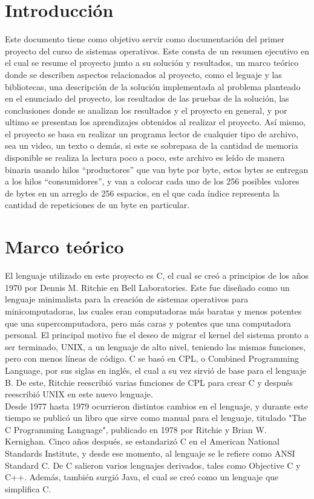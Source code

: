 \documentclass[10pt, article, natbib]{IEEEtran}
\begin{document}
\section{Introducción}
Este documento tiene como objetivo servir como documentación del primer proyecto del curso de sistemas operativos. Este consta de un resumen ejecutivo en el cual se resume el proyecto junto a su solución y resultados, un marco teórico donde se describen aspectos relacionados al proyecto, como el leguaje y las bibliotecas, una descripción de la solución implementada al problema planteado en el enunciado del proyecto, los resultados de las pruebas de la solución, las conclusiones donde se analizan los resultados y el proyecto en general, y por ultimo se presentan los aprendizajes obtenidos al realizar el proyecto. Así mismo, el proyecto se basa en realizar un programa lector de cualquier tipo de archivo, sea un video, un texto o demás, si este se sobrepasa de la cantidad de memoria disponible se realiza la lectura poco a poco, este archivo es leído de manera binaria usando hilos “productores” que van byte por byte, estos bytes se entregan a los hilos “consumidores”, y van a colocar cada uno de los 256 posibles valores de bytes en un arreglo de 256 espacios, en el que cada índice representa la cantidad de repeticiones de un byte en particular.

\section{Marco teórico}
El lenguaje utilizado en este proyecto es C, el cual se creó a principios de los años 1970 por Dennis M. Ritchie en Bell Laboratories. Este fue diseñado como un lenguaje minimalista para la creación de sistemas operativos para minicomputadoras, las cuales eran computadoras más baratas y menos potentes que una supercomputadora, pero más caras y potentes que una computadora personal. El principal motivo fue el deseo de migrar el kernel del sistema pronto a ser terminado, UNIX, a un lenguaje de alto nivel, teniendo las mismas funciones, pero con menos líneas de código. C se basó en CPL, o Combined Programming Language, por sus siglas en inglés, el cual a su vez sirvió de base para el lenguaje B. De este, Ritchie reescribió varias funciones de CPL para crear C y después reescribió UNIX en este nuevo lenguaje.\cite{encyclopdiabritannica_2022_c} \cite{munoz_after}\\

Desde 1977 hasta 1979 ocurrieron distintos cambios en el lenguaje, y durante este tiempo se publicó un libro que sirve como manual para el lenguaje, titulado "The C Programming Language", publicado en 1978 por Ritchie y Brian W. Kernighan. Cinco años después, se estandarizó C en el American National Standards Institute, y desde ese momento, al lenguaje se le refiere como ANSI Standard C. De C salieron varios lenguajes derivados, tales como Objective C y C++. Además, también surgió Java, el cual se creó como un lenguaje que simplifica C.\cite{mritchie_1993_the}\\
\end{document}
